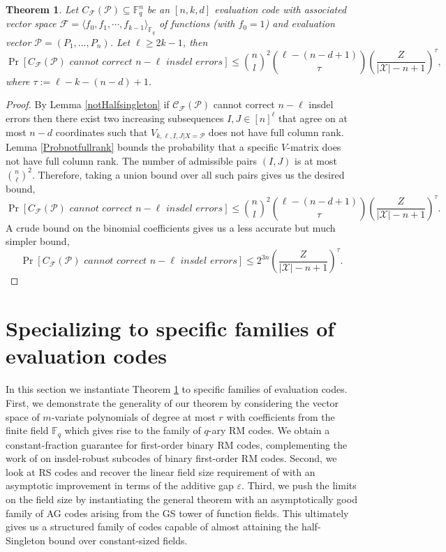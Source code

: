 \documentclass[draft, onecolumn, 11pt]{IEEEtran}
\newtheorem{theorem}{Theorem}[]
\newcommand{\F}{\mathbb{F}}
\begin{document}
\begin{theorem} \label{ultimate}
    Let $C_{\mathcal{F}}(\mathcal{P}) \subseteq \F_q^n$ be an $[n,k,d]$ evaluation code with associated vector space $\mathcal{F} = \langle f_0, f_1, \dotsm , f_{k-1}\rangle_{\F_q}$ of functions (with $f_0 = 1$) and evaluation vector $\mathcal{P} = (P_1, \dots, P_n)$. Let $\ell \geq 2k-1$, then
    $$\Pr[C_{\mathcal{F}}(\mathcal{P}) \textit{ cannot correct $n-\ell$ insdel errors}] \leq \binom{n}{l}^2 \binom{\ell - (n - d + 1)}{\tau} \left(\frac{Z}{|\mathcal{X}| - n + 1}\right)^\tau,$$
    where $\tau  := \ell - k - (n - d) + 1$.
\end{theorem}
\begin{proof}
    By Lemma \ref{notHalfsingleton} if $\mathcal{C_F(P)}$ cannot correct $n-\ell$ insdel errors then there exist two increasing subsequences $I,J \in [n]^\ell$ that agree on at most $n-d$ coordinates such that $V_{k,\ell, I,J | X = \mathcal{P}}$ does not have full column rank. Lemma \ref{Probnotfullrank} bounds the probability that a specific $V$-matrix does not have full column rank. The number of admissible pairs $(I,J)$ is at most $\binom{n}{\ell}^2$. Therefore, taking a union bound over all such pairs gives us the desired bound,
    $$\Pr[C_{\mathcal{F}}(\mathcal{P}) \textit{ cannot correct $n-\ell$ insdel errors}] \leq \binom{n}{l}^2 \binom{\ell - (n - d + 1)}{\tau} \left(\frac{Z}{|\mathcal{X}| - n + 1}\right)^\tau.$$
    A crude bound on the binomial coefficients gives us a less accurate but much simpler bound,
    $$\Pr[C_{\mathcal{F}}(\mathcal{P}) \textit{ cannot correct $n-\ell$ insdel errors}] \leq 2^{3n}\left(\frac{Z}{|\mathcal{X}| - n + 1}\right)^\tau.$$
\end{proof}

\section{Specializing to specific families of evaluation codes}

In this section we instantiate Theorem \ref{ultimate} to specific families of evaluation codes. First, we demonstrate the generality of our theorem by considering the vector space of $m$-variate polynomials of degree at most $r$ with coefficients from the finite field $\F_q$ which gives rise to the family of $q$-ary RM codes. We obtain a constant-fraction guarantee for first-order binary RM codes, complementing the work of \cite{qiu2026binary} on insdel-robust subcodes of binary first-order RM codes. Second, we look at RS codes and recover the linear field size requirement of \cite{con2024randomRS} with an asymptotic improvement in terms of the additive gap $\varepsilon$. Third, we push the limits on the field size by instantiating the general theorem with an asymptotically good family of AG codes arising from the GS tower of function fields. This ultimately gives us a structured family of codes capable of almost attaining the half-Singleton bound over constant-sized fields.
\end{document}
